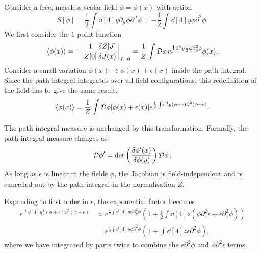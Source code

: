 Consider a free, massless scalar field $\phi = \phi(x)$ with action
\begin{equation}
  S[\phi] = \frac{1}{2} \int \dd[4]{y} \partial_{\mu} \phi \partial^{\mu} \phi = -\frac{1}{2} \int \dd[4]{y} \phi \partial^2 \phi.
\end{equation}
We first consider the 1-point function
\begin{equation}
  \label{eq:18-1pt}
  \langle \phi(x) \rangle = -\left.\frac{1}{Z[0]}\frac{\delta Z[J]}{\delta J(x)} \right\rvert_{J = 0} = \frac{1}{Z} \int \mathop{\mathcal{D} \phi} e^{\int \dd[4]{y} \frac{1}{2} \phi \partial^2_y \phi} \phi(x).
\end{equation}
Consider a small variation $\phi(x) \to \phi(x) + \epsilon(x)$ inside the path integral.
Since the path integral integrates over all field configurations, this redefinition of the field has to give the same result.
\begin{equation}
  \label{eq:18-e}
  \langle \phi(x) \rangle = \frac{1}{Z} \int \mathop{\mathcal{D} \phi} [\phi(x) + \epsilon(x)] e^{\frac{1}{2} \int \dd[4]{y} (\phi + \epsilon) \partial^2 (\phi + \epsilon)}.
\end{equation}
\begin{leftbar}
  \begin{remark}
    The path integral measure is unchanged by this transformation.
    Formally, the path integral measure changes as
    \begin{equation}
      \mathop{\mathcal{D} \phi'} = \det \left( \frac{\delta \phi'(x)}{\delta \phi(y)} \right) \mathop{\mathcal{D} \phi}.
    \end{equation}
    As long as $\epsilon$ is linear in the fields $\phi$, the Jacobian is field-independent and is cancelled out by the path integral in the normalisation $Z$.
  \end{remark}
\end{leftbar}
Expanding to first order in $\epsilon$, the exponential factor becomes
\begin{align}
  e^{\int \dd[4]{y} \frac{1}{2} (\phi + \epsilon) \partial^2 (\phi + \epsilon)} &\approx e^{\frac{1}{2} \int \dd[4]{y} \phi \partial^2_y \phi} \left( 1 + \frac{1}{2} \int \dd[4]{z} (\phi \partial^2_z \epsilon + \epsilon \partial^2_z \phi) \right) \\
										&= e^{\frac{1}{2} \int \dd[4]{y} \phi \partial^2 \phi} \left( 1 + \int \dd[4]{z} \epsilon \partial^2 \phi \right),
\end{align}
where we have integrated by parts twice to combine the $\epsilon \partial^2 \phi$ and $\phi \partial^2 \epsilon$ terms.
